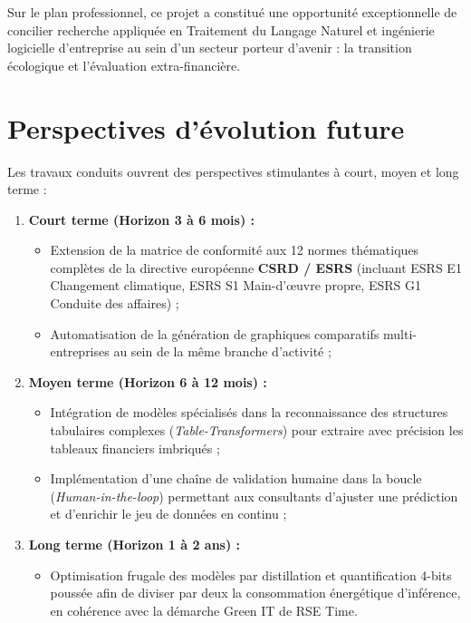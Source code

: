 \documentclass[12pt,a4paper]{report}
\begin{document}
Sur le plan professionnel, ce projet a constitué une opportunité exceptionnelle de concilier recherche appliquée en Traitement du Langage Naturel et ingénierie logicielle d'entreprise au sein d'un secteur porteur d'avenir : la transition écologique et l'évaluation extra-financière.

\section{Perspectives d'évolution future}
Les travaux conduits ouvrent des perspectives stimulantes à court, moyen et long terme :
\begin{enumerate}
    \item \textbf{Court terme (Horizon 3 à 6 mois) :}
    \begin{itemize}
        \item Extension de la matrice de conformité aux 12 normes thématiques complètes de la directive européenne \textbf{CSRD / ESRS} (incluant ESRS E1 Changement climatique, ESRS S1 Main-d'œuvre propre, ESRS G1 Conduite des affaires) ;
        \item Automatisation de la génération de graphiques comparatifs multi-entreprises au sein de la même branche d'activité ;
    \end{itemize}
    \item \textbf{Moyen terme (Horizon 6 à 12 mois) :}
    \begin{itemize}
        \item Intégration de modèles spécialisés dans la reconnaissance des structures tabulaires complexes (\textit{Table-Transformers}) pour extraire avec précision les tableaux financiers imbriqués ;
        \item Implémentation d'une chaîne de validation humaine dans la boucle (\textit{Human-in-the-loop}) permettant aux consultants d'ajuster une prédiction et d'enrichir le jeu de données en continu ;
    \end{itemize}
    \item \textbf{Long terme (Horizon 1 à 2 ans) :}
    \begin{itemize}
        \item Optimisation frugale des modèles par distillation et quantification 4-bits poussée afin de diviser par deux la consommation énergétique d'inférence, en cohérence avec la démarche Green IT de RSE Time.
    \end{itemize}
\end{enumerate}

\newpage
\end{document}
